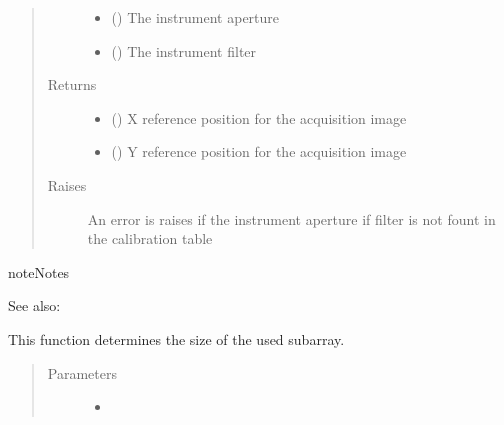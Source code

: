 \documentclass[a4paper,10pt,english]{sphinxmanual}
\begin{document}
\begin{fulllineitems}
\begin{fulllineitems}
\begin{quote}
\begin{description}
\begin{itemize}
\item {} 
 () \textendash{} The instrument aperture

\item {} 
 () \textendash{} The instrument filter

\end{itemize}

\item[{Returns}] \leavevmode
\begin{itemize}
\item {} 
 () \textendash{} X reference position for the acquisition image

\item {} 
 () \textendash{} Y reference position for the acquisition image

\end{itemize}


\item[{Raises}] \leavevmode
{} \textendash{} An error is raises if the instrument aperture if filter is not
fount in the calibration table

\end{description}\end{quote}

\begin{sphinxadmonition}{note}{Notes}
\begin{description}
\item[{See also:}] \leavevmode
{}

\end{description}
\end{sphinxadmonition}

\end{fulllineitems}


\begin{fulllineitems}
\label{\detokenize{cascade.instruments:cascade.instruments.instruments.HSTWFC3._get_subarray_size}}
This function determines the size of the used subarray.
\begin{quote}\begin{description}
\item[{Parameters}] \leavevmode\begin{itemize}
\item {} 
 \textendash{} 


\end{itemize}
\end{description}
\end{quote}
\end{fulllineitems}
\end{fulllineitems}
\end{document}
